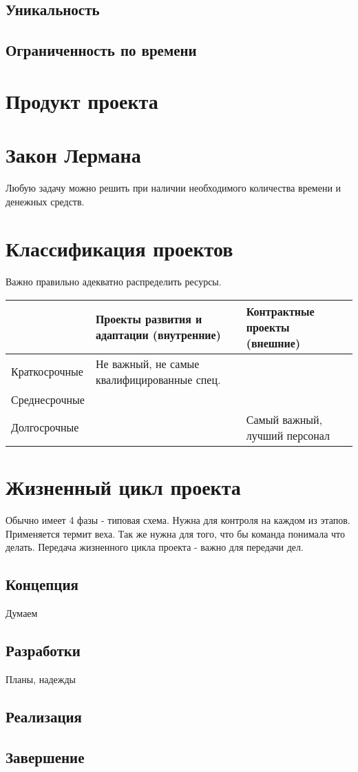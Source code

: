 \subsection{Уникальность}
\subsection{Ограниченность по времени}

\section{Продукт проекта}

\section{Закон Лермана}
Любую задачу можно решить при наличии необходимого количества времени и денежных средств.

\section{Классификация проектов}

Важно правильно адекватно распределить ресурсы.

\begin{table}[h!]
\begin{tabular}{|l|l|l|}
\hline
              & Проекты развития и адаптации (внутренние)   & Контрактные проекты (внешние) \\ \hline
Краткосрочные & Не важный, не самые квалифицированные спец. &                               \\ \hline
Среднесрочные &                                             &                               \\ \hline
Долгосрочные  &                                             & Самый важный, лучший персонал \\ \hline
\end{tabular}
\end{table}

\section{Жизненный цикл проекта}

Обычно имеет 4 фазы - типовая схема. Нужна для контроля на каждом из этапов. Применяется термит веха. Так же нужна для того, что бы команда понимала что делать. Передача жизненного цикла проекта - важно для передачи дел.

\subsection{Концепция}
Думаем
\subsection{Разработки}
Планы, надежды
\subsection{Реализация}
\subsection{Завершение}
